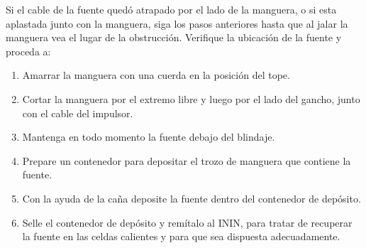 
Si el cable de la fuente quedó atrapado por el lado de la manguera, o si esta aplastada junto con la manguera, siga los pasos anteriores hasta que al jalar la manguera vea el lugar de la obstrucción. Verifique la ubicación de la fuente y proceda a:

\begin{enumerate}
    \item Amarrar la manguera con una cuerda en la posición del tope.
    \item Cortar la manguera por el extremo libre y luego por el lado del gancho, junto con el cable del impulsor.
    \item Mantenga en todo momento la fuente debajo del blindaje.
    \item Prepare un contenedor para depositar el trozo de manguera que contiene la fuente.
    \item Con la ayuda de la caña deposite la fuente dentro del contenedor de depósito.
    \item Selle el contenedor de depósito y remítalo al ININ, para tratar de recuperar la fuente en las celdas calientes y para que sea dispuesta adecuadamente.
\end{enumerate}
